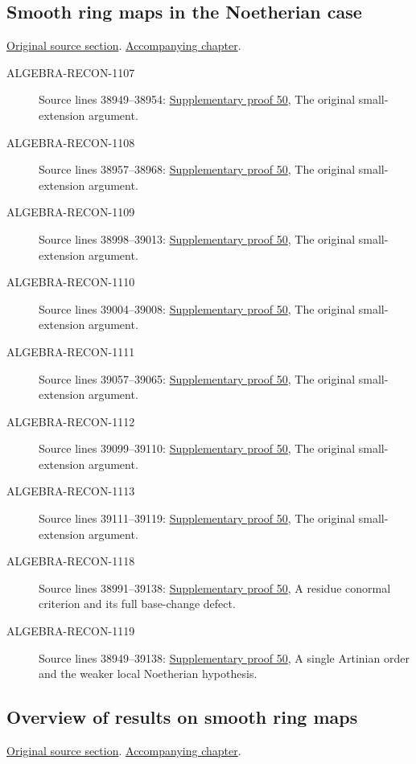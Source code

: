 \subsection{Smooth ring maps in the Noetherian case}
\hypertarget{algebra-source-section-smooth-Noetherian}{}
\noindent\href{https://github.com/stacks/stacks-project/blob/a04446e57ec1fbc252a871afcec7752fb2807b14/algebra.tex\#L38933}{Original source section}. \href{algebra.pdf\#nameddest=section-smooth-Noetherian}{Accompanying chapter}.

\begin{description}
\item[ALGEBRA-RECON-1107] Source lines 38949--38954: \hyperlink{algebra_smooth_artin_notes_20260928}{Supplementary proof 50}, The original small-extension argument.
\item[ALGEBRA-RECON-1108] Source lines 38957--38968: \hyperlink{algebra_smooth_artin_notes_20260928}{Supplementary proof 50}, The original small-extension argument.
\item[ALGEBRA-RECON-1109] Source lines 38998--39013: \hyperlink{algebra_smooth_artin_notes_20260928}{Supplementary proof 50}, The original small-extension argument.
\item[ALGEBRA-RECON-1110] Source lines 39004--39008: \hyperlink{algebra_smooth_artin_notes_20260928}{Supplementary proof 50}, The original small-extension argument.
\item[ALGEBRA-RECON-1111] Source lines 39057--39065: \hyperlink{algebra_smooth_artin_notes_20260928}{Supplementary proof 50}, The original small-extension argument.
\item[ALGEBRA-RECON-1112] Source lines 39099--39110: \hyperlink{algebra_smooth_artin_notes_20260928}{Supplementary proof 50}, The original small-extension argument.
\item[ALGEBRA-RECON-1113] Source lines 39111--39119: \hyperlink{algebra_smooth_artin_notes_20260928}{Supplementary proof 50}, The original small-extension argument.
\item[ALGEBRA-RECON-1118] Source lines 38991--39138: \hyperlink{algebra_smooth_artin_notes_20260928}{Supplementary proof 50}, A residue conormal criterion and its full base-change defect.
\item[ALGEBRA-RECON-1119] Source lines 38949--39138: \hyperlink{algebra_smooth_artin_notes_20260928}{Supplementary proof 50}, A single Artinian order and the weaker local Noetherian hypothesis.
\end{description}

\subsection{Overview of results on smooth ring maps}
\hypertarget{algebra-source-section-smooth-overview}{}
\noindent\href{https://github.com/stacks/stacks-project/blob/a04446e57ec1fbc252a871afcec7752fb2807b14/algebra.tex\#L39148}{Original source section}. \href{algebra.pdf\#nameddest=section-smooth-overview}{Accompanying chapter}.

